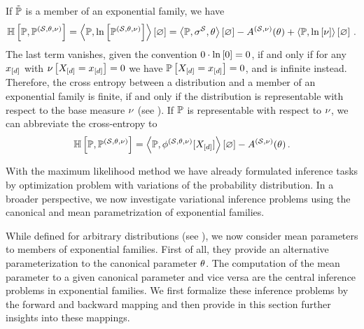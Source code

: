 \begin{example}
    \label{exa:cEntropyExp}
    If $\tilde{\mathbb{P}}$ is a member of an exponential family, we have %
    \begin{align*}
        \mathbb{H}\left[\mathbb{P},\mathbb{P}^{(\mathcal{S},\theta,\nu)}\right]
        = \left\langle \mathbb{P},\ln \left[ \mathbb{P}^{(\mathcal{S},\theta,\nu)} \right]\right\rangle \left[ \varnothing \right]
        = \left\langle \mathbb{P},\sigma^{\mathcal{S}},\theta\right\rangle \left[ \varnothing \right] - A^{(\mathcal{S},\nu)}(\theta) + \left\langle \mathbb{P},\ln \left[ \nu \right]\right\rangle \left[ \varnothing \right] \, .
    \end{align*}
    The last term vanishes, given the convention $0\cdot\ln \left[ 0 \right]=0$, if and only if for any $x_{[d]}$ with $\nu\left[X_{[d]}=x_{[d]}\right]=0$ we have $\mathbb{P}\left[X_{[d]}=x_{[d]}\right]=0$, and is infinite instead.
    Therefore, the cross entropy between a distribution and a member of an exponential family is finite, if and only if the distribution is representable with respect to the base measure $\nu$ (see ).
    If $\mathbb{P}$ is representable with respect to $\nu$, we can abbreviate the cross-entropy to
    \begin{align*}
        \mathbb{H}\left[\mathbb{P},\mathbb{P}^{(\mathcal{S},\theta,\nu)}\right]
        = \left\langle \mathbb{P},\phi^{(\mathcal{S},\theta,\nu)}[X_{[d]}]\right\rangle \left[ \varnothing \right] -A^{(\mathcal{S},\nu)}(\theta) \, .
    \end{align*}
\end{example}




With the maximum likelihood method we have already formulated inference tasks by optimization problem with variations of the probability distribution.
In a broader perspective, we now investigate variational inference problems using the canonical and mean parametrization of exponential families.


While defined for arbitrary distributions (see ), we now consider mean parameters to members of exponential families.
First of all, they provide an alternative parameterization to the canonical parameter $\theta$.
The computation of the mean parameter to a given canonical parameter and vice versa are the central inference problems in exponential families.
We first formalize these inference problems by the forward and backward mapping and then provide in this section further insights into these mappings.

